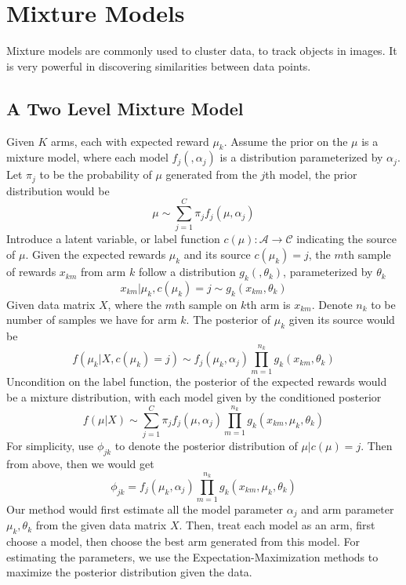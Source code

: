 \documentclass{article}
\begin{document}
\section{ Mixture Models }
Mixture models are commonly used to cluster data\citep{mixtureclustering}, to track objects in images\citep{cvprmixture}. It is very powerful in discovering similarities between data points. 

\subsection{ A Two Level Mixture Model }
Given $K$ arms, each with expected reward $\mu_k$. Assume the prior on the $\mu$ is a mixture model, where each model $f_j(,\alpha_j)$ is a distribution parameterized by $\alpha_j$. Let $\pi_j$ to be the probability of $\mu$ generated from the $j$th model, the prior distribution would be
\begin{equation}
\mu \sim \sum\limits_{j=1}^C \pi_j f_j(\mu,\alpha_j)
\end{equation}
Introduce a latent variable, or label function $c(\mu):\mathcal{A}\rightarrow \mathcal{C}$ indicating the source of $\mu$. Given the expected rewards $\mu_k$ and its source $c(\mu_k)=j$, the $m$th sample of rewards $x_{km}$ from arm $k$ follow a distribution $g_k(,\theta_k)$, parameterized by $\theta_k$
\begin{equation}
x_{km}|\mu_k,c(\mu_k) = j \sim g_k(x_{km},\theta_k)
\end{equation}
Given data matrix $X$, where the $m$th sample on $k$th arm is $x_{km}$. Denote $n_k$ to be number of samples we have for arm $k$. The posterior of $\mu_k$ given its source would be
\begin{equation}
f(\mu_k|X,c(\mu_k)=j) \sim f_j(\mu_k,\alpha_j) \prod\limits_{m=1}^{n_k} g_k(x_{km},\theta_k)
\end{equation}
Uncondition on the label function, the posterior of the expected rewards would be a mixture distribution, with each model given by the conditioned posterior
\begin{equation}
f(\mu|X)\sim \sum\limits_{j=1}^C \pi_j f_j(\mu,\alpha_j)\prod\limits_{m=1}^{n_k} g_k(x_{km},\mu_k,\theta_k)
\end{equation}
For simplicity, use $\phi_{jk}$ to denote the posterior distribution of $\mu|c(\mu)=j$. Then from above, then we would get
\begin{equation}
\phi_{jk} = f_j(\mu_k,\alpha_j)\prod\limits_{m=1}^{n_k}g_k(x_{km},\mu_k,\theta_k)
\end{equation} Our method would first estimate all the model parameter $\alpha_j$ and arm parameter $\mu_k,\theta_k$ from the given data matrix $X$. Then, treat each model as an arm, first choose a model, then choose the best arm generated from this model. For estimating the parameters, we use the Expectation-Maximization methods to maximize the posterior distribution given the data. 
\end{document}
